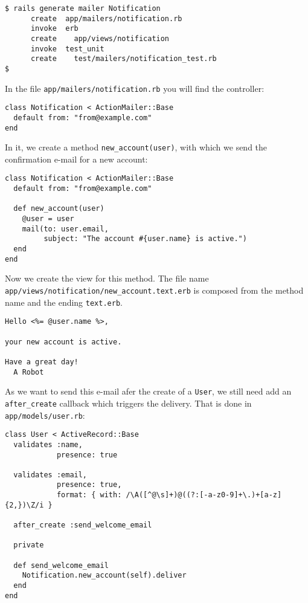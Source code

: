 \documentclass[a4paper]{book}
\begin{document}
\begin{shaded}\begin{verbatim}
$ rails generate mailer Notification
      create  app/mailers/notification.rb
      invoke  erb
      create    app/views/notification
      invoke  test_unit
      create    test/mailers/notification_test.rb
$
\end{verbatim}\end{shaded}

In the file \texttt{app/mailers/notification.rb} you will find the controller:

\begin{shaded}\begin{verbatim}
class Notification < ActionMailer::Base
  default from: "from@example.com"
end
\end{verbatim}\end{shaded}

In it, we create a method \texttt{new\_account(user)}, with which we send the confirmation e-mail for a new account:

\begin{shaded}\begin{verbatim}
class Notification < ActionMailer::Base
  default from: "from@example.com"

  def new_account(user)
    @user = user
    mail(to: user.email,
         subject: "The account #{user.name} is active.")
  end
end
\end{verbatim}\end{shaded}

Now we create the view for this method. The file name \texttt{app/views/notification/new\_account.text.erb} is composed from the method name and the ending \texttt{text.erb}.

\begin{shaded}\begin{verbatim}
Hello <%= @user.name %>,

your new account is active.

Have a great day!
  A Robot
\end{verbatim}\end{shaded}

As we want to send this e-mail afer the create of a \texttt{User}, we still need add an \texttt{after\_create} callback which triggers the delivery. That is done in \texttt{app/models/user.rb}:

\begin{shaded}\begin{verbatim}
class User < ActiveRecord::Base
  validates :name,
            presence: true

  validates :email,
            presence: true,
            format: { with: /\A([^@\s]+)@((?:[-a-z0-9]+\.)+[a-z]{2,})\Z/i }

  after_create :send_welcome_email

  private

  def send_welcome_email
    Notification.new_account(self).deliver
  end
end
\end{verbatim}\end{shaded}
\end{document}
